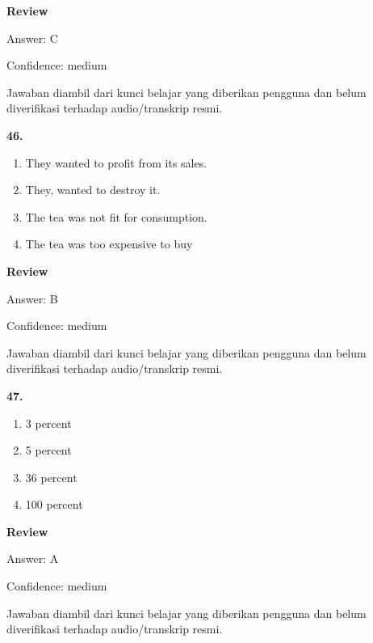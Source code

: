 \documentclass[12pt]{article}
\begin{document}
\par
\begingroup
\setlength{\parskip}{0pt}
\setlength{\parindent}{0pt}
\textbf{Review}\par
Answer: C\par
Confidence: medium\par
Jawaban diambil dari kunci belajar yang diberikan pengguna dan belum diverifikasi terhadap audio/transkrip resmi.\par
\endgroup
\par
\vspace{0.25\baselineskip}
\noindent\textbf{46.}
\begin{enumerate}[label=(\Alph*),leftmargin=*,itemsep=0.2em]
\item They wanted to profit from its sales.
\item They, wanted to destroy it.
\item The tea was not fit for consumption.
\item The tea was too expensive to buy
\end{enumerate}
\par
\begingroup
\setlength{\parskip}{0pt}
\setlength{\parindent}{0pt}
\textbf{Review}\par
Answer: B\par
Confidence: medium\par
Jawaban diambil dari kunci belajar yang diberikan pengguna dan belum diverifikasi terhadap audio/transkrip resmi.\par
\endgroup
\par
\vspace{0.25\baselineskip}
\noindent\textbf{47.}
\begin{enumerate}[label=(\Alph*),leftmargin=*,itemsep=0.2em]
\item 3 percent
\item 5 percent
\item 36 percent
\item 100 percent
\end{enumerate}
\par
\begingroup
\setlength{\parskip}{0pt}
\setlength{\parindent}{0pt}
\textbf{Review}\par
Answer: A\par
Confidence: medium\par
Jawaban diambil dari kunci belajar yang diberikan pengguna dan belum diverifikasi terhadap audio/transkrip resmi.\par
\endgroup
\par
\vspace{0.25\baselineskip}
\end{document}
